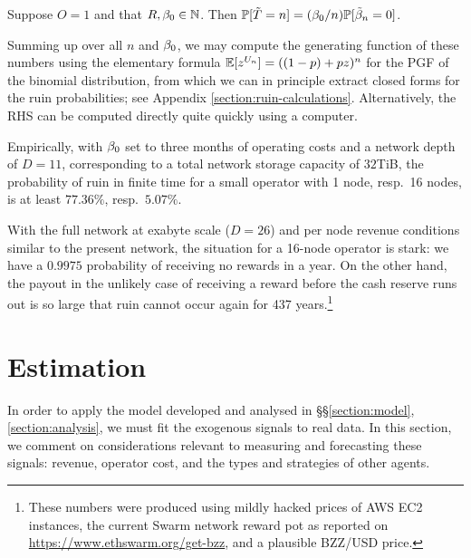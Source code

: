 \begin{proposition}

  Suppose $O=1$ and that $R,\beta_0\in\mathbb{N}$.
  Then $\mathbb{P}[\tilde{T}=n] = (\beta_0/n)\mathbb{P}[\tilde{\beta}_n=0]$.

\end{proposition}

Summing up over all $n$ and $\beta_0$, we may compute the generating function of these numbers using the elementary formula $\mathbb{E}[z^{U_n}] = ((1-p) + pz)^n$ for the PGF of the binomial distribution, from which we can in principle extract closed forms for the ruin probabilities; see Appendix \ref{section:ruin-calculations}.
%
Alternatively, the RHS can be computed directly quite quickly using a computer.    
  


\begin{example}
\label{smno-calculations}

Empirically, with $\beta_0$ set to three months of operating costs and a network depth of $D=11$, corresponding to a total network storage capacity of $32$TiB, the probability of ruin in finite time for a small operator with 1 node, resp.~16 nodes, is at least $77.36\%$, resp.~$5.07\%$.
    
With the full network at exabyte scale ($D=26$) and per node revenue conditions similar to the present network, the situation for a 16-node operator is stark: we have a $0.9975$ probability of receiving no rewards in a year.
%
On the other hand, the payout in the unlikely case of receiving a reward before the cash reserve runs out is so large that ruin cannot occur again for 437 years.\footnote{These numbers were produced using mildly hacked prices of AWS EC2 instances, the current Swarm network reward pot as reported on \url{https://www.ethswarm.org/get-bzz}, and a plausible BZZ/USD price.}

\end{example}


\section{Estimation}
\label{section:estimation}

In order to apply the model developed and analysed in \S\S\ref{section:model},\ref{section:analysis}, we must fit the exogenous signals to real data.
%
In this section, we comment on considerations relevant to measuring and forecasting these signals: revenue, operator cost, and the types and strategies of other agents.


